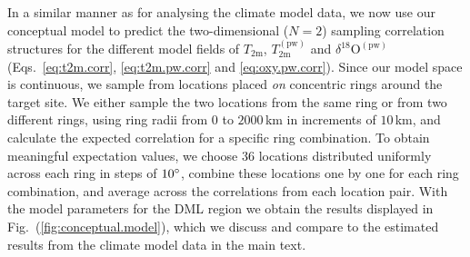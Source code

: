 \documentclass[cp, manuscript, draft]{copernicus}
\begin{document}
In a similar manner as for analysing the climate model data, we now use our
conceptual model to predict the two-dimensional ($N=2$) sampling correlation
structures for the different model fields of $T_{\mathrm{2m}}$,
$T_{\mathrm{2m}}^{\mathrm{(pw)}}$ and $\delta^{18}\mathrm{O}^{\mathrm{(pw)}}$
(Eqs.~\ref{eq:t2m.corr}, \ref{eq:t2m.pw.corr} and \ref{eq:oxy.pw.corr}). Since
our model space is continuous, we sample from locations placed \emph{on}
concentric rings around the target site. We either sample the two locations from
the same ring or from two different rings, using ring radii from $0$ to
$2000$\,km in increments of $10$\,km, and calculate the expected correlation for
a specific ring combination. To obtain meaningful expectation values, we choose
$36$ locations distributed uniformly across each ring in steps of $10^{\circ}$,
combine these locations one by one for each ring combination, and average across
the correlations from each location pair. With the model parameters for the DML
region we obtain the results displayed in Fig.~(\ref{fig:conceptual.model}),
which we discuss and compare to the estimated results from the climate model
data in the main text.

\noappendix





\end{document}
